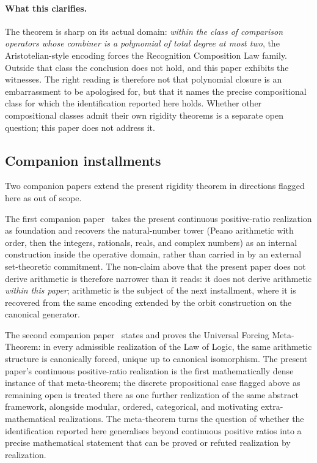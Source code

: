 \documentclass[11pt,a4paper]{article}
\theoremstyle{definition}
\theoremstyle{remark}
\begin{document}
\paragraph{What this clarifies.} The theorem is sharp on its actual
domain: \emph{within the class of comparison operators whose
combiner is a polynomial of total degree at most two}, the
Aristotelian-style encoding forces the Recognition Composition Law
family. Outside that class the conclusion does not hold, and this
paper exhibits the witnesses. The right reading is therefore not
that polynomial closure is an embarrassment to be apologised for, but
that it names the precise compositional class for which the
identification reported here holds. Whether other compositional
classes admit their own rigidity theorems is a separate open question;
this paper does not address it.

\subsection{Companion installments}\label{subsec:companions}

Two companion papers extend the present rigidity theorem in directions
flagged here as out of scope.

The first companion paper~\cite{Washburn2026Arithmetic} takes the
present continuous positive-ratio realization as foundation and
recovers the natural-number tower (Peano arithmetic with order, then
the integers, rationals, reals, and complex numbers) as an internal
construction inside the operative domain, rather than carried in by an
external set-theoretic commitment. The non-claim above that the present
paper does not derive arithmetic is therefore narrower than it reads: it
does not derive arithmetic \emph{within this paper}; arithmetic is the
subject of the next installment, where it is recovered from the same
encoding extended by the orbit construction on the canonical generator.

The second companion paper~\cite{Washburn2026UniversalForcing} states
and proves the Universal Forcing Meta-Theorem: in every admissible
realization of the Law of Logic, the same arithmetic structure is
canonically forced, unique up to canonical isomorphism. The present
paper's continuous positive-ratio realization is the first
mathematically dense instance of that meta-theorem; the discrete
propositional case flagged above as remaining open is treated there as
one further realization of the same abstract framework, alongside
modular, ordered, categorical, and motivating extra-mathematical
realizations. The meta-theorem turns the question of whether the
identification reported here generalises beyond continuous positive
ratios into a precise mathematical statement that can be proved or
refuted realization by realization.
\end{document}
